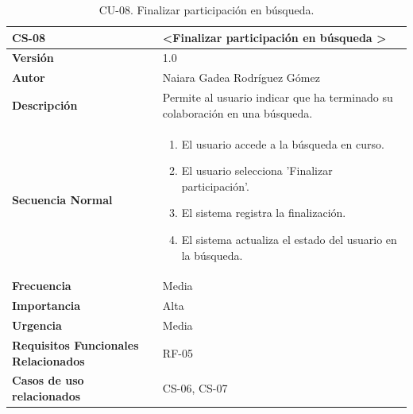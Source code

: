 \begin{table}[htbp] %
\centering
\begin{tabular}{ |m{3cm}|m{11cm}|  } 
\hline
\cellcolor[HTML]{B9E3F0}\centering\textbf{CS-08} & \cellcolor[HTML]{B9E3F0}\textbf{\textless Finalizar participación en búsqueda \textgreater}\\

\hline
\cellcolor[HTML]{EFEFEF}\textbf{Versión}             & 1.0  \\
\hline
\cellcolor[HTML]{EFEFEF}\textbf{Autor}                & Naiara Gadea Rodríguez Gómez\\
\hline
\cellcolor[HTML]{EFEFEF}\textbf{Descripción}                & { Permite al usuario indicar que ha terminado su colaboración en una búsqueda. }\\
\hline
\cellcolor[HTML]{EFEFEF}\textbf{Secuencia \newline Normal}                &                 
        \begin{enumerate}
            \item El usuario accede a la búsqueda en curso.
            \item El usuario selecciona 'Finalizar participación'.
            \item El sistema registra la finalización.
            \item El sistema actualiza el estado del usuario en la búsqueda.
        \end{enumerate}\\
\hline
\cellcolor[HTML]{EFEFEF}\textbf{Frecuencia}                & Media\\
\hline
\cellcolor[HTML]{EFEFEF}\textbf{Importancia}                & Alta\\
\hline
\cellcolor[HTML]{EFEFEF}\textbf{Urgencia}                & Media\\
\hline
\cellcolor[HTML]{EFEFEF}\textbf{Requisitos Funcionales Relacionados}                & { RF-05 }\\
\hline
\cellcolor[HTML]{EFEFEF}\textbf{Casos de uso relacionados}                & { CS-06, CS-07 }\\
\hline
\end{tabular}
\caption{CU-08. Finalizar participación en búsqueda.}
\end{table}



